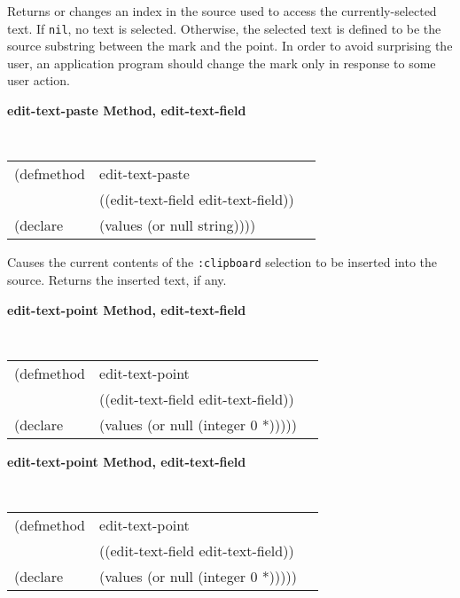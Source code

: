 \begin{flushright} \parbox[t]{6.125in}{
Returns or changes an index in the
source used to access the currently-selected text. If {\tt nil}, no text is
selected. Otherwise, the selected text is defined to be the source substring
between the mark and the point. In order to
avoid surprising the user, an application program should change the mark only in
response to some user action.} 
\end{flushright}

{\samepage
{\large {\bf edit-text-paste \hfill Method, edit-text-field}}
\begin{flushright} \parbox[t]{6.125in}{
\tt
\begin{tabular}{lll}
\raggedright
(defmethod & edit-text-paste & \\
           & ((edit-text-field  edit-text-field)) \\
(declare   & (values (or null string))))
\end{tabular}
\rm

}\end{flushright}}

\begin{flushright} \parbox[t]{6.125in}{
Causes the current contents of the {\tt :clipboard} selection to be
inserted into the source.
Returns the inserted text, if any.

}\end{flushright}



        
{\samepage  
{\large {\bf edit-text-point \hfill Method, edit-text-field}}
\begin{flushright} \parbox[t]{6.125in}{
\tt
\begin{tabular}{lll}
\raggedright
(defmethod & edit-text-point & \\
& ((edit-text-field  edit-text-field)) \\
(declare & (values (or null (integer 0 *)))))
\end{tabular}
\rm

}\end{flushright}}

{\samepage  
{\large {\bf edit-text-point \hfill Method, edit-text-field}}
\begin{flushright} \parbox[t]{6.125in}{
\tt
\begin{tabular}{lll}
\raggedright
(defmethod & edit-text-point & \\
& ((edit-text-field  edit-text-field)) \\
(declare & (values (or null (integer 0 *)))))
\end{tabular}
\rm

}\end{flushright}}

